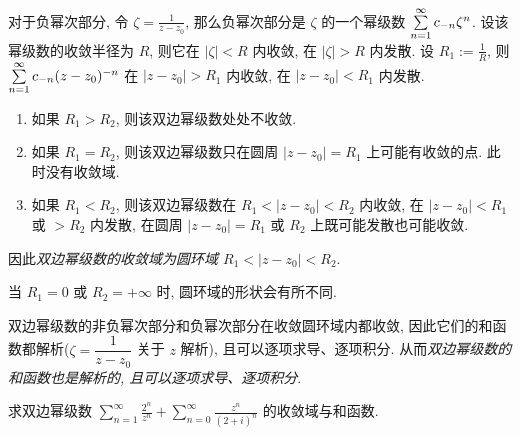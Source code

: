对于负幂次部分, 令 $\zeta=\frac1{z-z_0}$, 那么负幂次部分是 $\zeta$ 的一个幂级数 $\sum\limits_{n=1}^\infty c_{-n}\zeta^n$.
设该幂级数的收敛半径为 $R$, 则它在 $|\zeta|<R$ 内收敛, 在 $|\zeta|>R$ 内发散.
设 $R_1:=\frac1R$, 则 $\sum\limits_{n=1}^\infty c_{-n}(z-z_0)^{-n}$ 在 $|z-z_0|>R_1$ 内收敛, 在 $|z-z_0|<R_1$ 内发散.

\begin{enumerate}
	\item 如果 $R_1>R_2$, 则该双边幂级数处处不收敛.
	\item 如果 $R_1=R_2$, 则该双边幂级数只在圆周 $|z-z_0|=R_1$ 上可能有收敛的点.
		此时没有收敛域.
	\item 如果 $R_1<R_2$, 则该双边幂级数在 $R_1<|z-z_0|<R_2$ 内收敛, 在 $|z-z_0|<R_1$ 或 $>R_2$ 内发散, 在圆周 $|z-z_0|=R_1$ 或 $R_2$ 上既可能发散也可能收敛.
\end{enumerate}

因此\emph{双边幂级数的收敛域为圆环域 $R_1<|z-z_0|<R_2$}.

当 $R_1=0$ 或 $R_2=+\infty$ 时, 圆环域的形状会有所不同.
\begin{center}
\end{center}

双边幂级数的非负幂次部分和负幂次部分在收敛圆环域内都收敛,
因此它们的和函数都解析($\zeta=\dfrac1{z-z_0}$ 关于 $z$ 解析), 且可以逐项求导、逐项积分.
从而\emph{双边幂级数的和函数也是解析的, 且可以逐项求导、逐项积分}.

\begin{example}
	求双边幂级数 $\displaystyle\sum_{n=1}^\infty\frac{2^n}{z^n}+\sum_{n=0}^\infty\frac{z^n}{(2+i)^n}$ 的收敛域与和函数.
\end{example}

